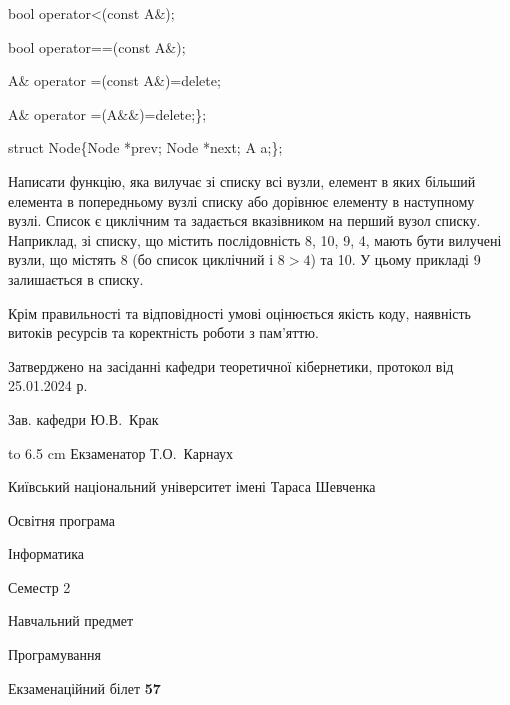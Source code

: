 \documentclass[12pt, ukrainian]{article}
\begin{document}
{\quad  bool operator<(const A\&); 

\quad  bool operator==(const A\&); 

\quad A\& operator =(const A\&)=delete; 

\quad  A\& operator =(A\&\&)=delete;\};

struct Node\{Node *prev; Node *next; A a;\};

Написати функцію, яка вилучає зі списку всі вузли, елемент в яких більший елемента в попередньому вузлі списку або дорівнює елементу в наступному вузлі. Список є циклічним та задається вказівником на перший вузол списку. Наприклад, зі списку, що містить послідовність 8, 10, 9, 4, мають бути вилучені вузли, що містять 8 (бо список циклічний і $8>4$) та 10. У цьому прикладі 9 залишається в списку.

Крім правильності та відповідності умові оцінюється якість коду, наявність витоків ресурсів та коректність роботи з пам'яттю. 

}
{\smallskip\smallskip \begin {scriptsize} Затверджено на засіданні кафедри теоретичної кібернетики, протокол   від   25.01.2024 р.\par\smallskip\smallskip\smallskip\smallskip
{\parbox {6.5 cm} {Зав. кафедри \dotfill Ю.В.~Крак}}\hspace {0.7cm} {\hbox to 6.5 cm { Екзаменатор \dotfill Т.О.~Карнаух}} \end{scriptsize}}
\newpage
{{\begin {scriptsize}\par
{ \center  Київський національний університет імені Тараса Шевченка \par}
{\parbox {5 cm}{Освітня програма \hfill}{\parbox {7 cm}{Інформатика\hfill}}\parbox {6 cm}{\hfill Семестр 2}}\par
{\parbox {5 cm} {Навчальний предмет \hfill}\parbox {7 cm}{Програмування \hfill}\parbox {6cm}{\hfill}\par}\vspace{-15pt} \end{scriptsize}}{\center Екзаменаційний білет \No \textbf { 57 }\par}}
\end{document}
